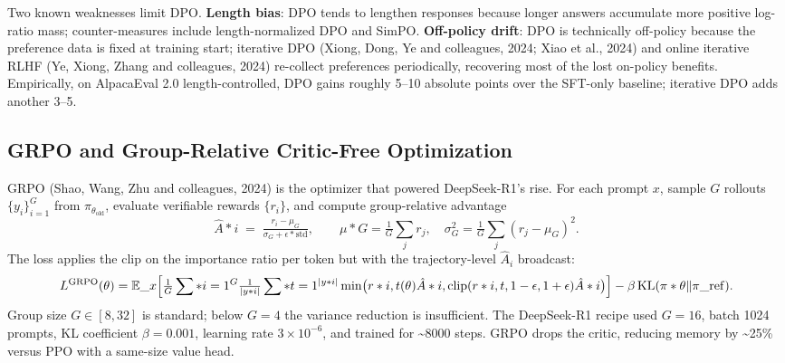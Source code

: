 Two known weaknesses limit DPO. \textbf{Length bias}: DPO tends to lengthen responses because longer answers accumulate more positive log-ratio mass; counter-measures include length-normalized DPO and SimPO. \textbf{Off-policy drift}: DPO is technically off-policy because the preference data is fixed at training start; iterative DPO (Xiong, Dong, Ye and colleagues, 2024; Xiao et al., 2024) and online iterative RLHF (Ye, Xiong, Zhang and colleagues, 2024) re-collect preferences periodically, recovering most of the lost on-policy benefits. Empirically, on AlpacaEval 2.0 length-controlled, DPO gains roughly 5--10 absolute points over the SFT-only baseline; iterative DPO adds another 3--5.

\subsection{GRPO and Group-Relative Critic-Free Optimization}\label{grpo-and-group-relative-critic-free-optimization}

GRPO (Shao, Wang, Zhu and colleagues, 2024) is the optimizer that powered DeepSeek-R1's rise. For each prompt \(x\), sample \(G\) rollouts \(\{y_i\}_{i=1}^{G}\) from \(\pi_{\theta_{\mathrm{old}}}\), evaluate verifiable rewards \(\{r_i\}\), and compute group-relative advantage
\[\hat A*i \;=\; \tfrac{r_i - \mu_G}{\sigma_G + \epsilon*{\mathrm{std}}}, \qquad \mu*G = \tfrac{1}{G}\sum_j r_j, \quad \sigma_G^2 = \tfrac{1}{G}\sum_j (r_j-\mu_G)^2.\]
The loss applies the clip on the importance ratio per token but with the trajectory-level \(\hat A_i\) broadcast:
\[L^{\mathrm{GRPO}}(\theta) = \mathbb{E}\_x\Bigl[ \tfrac{1}{G}\sum*{i=1}^{G} \tfrac{1}{|y*i|}\sum*{t=1}^{|y*i|} \min\bigl(r*{i,t}(\theta)\hat A*i, \mathrm{clip}(r*{i,t}, 1-\epsilon,1+\epsilon)\hat A*i\bigr) \Bigr] - \beta \,\mathrm{KL}(\pi*\theta \| \pi\_{\mathrm{ref}}).\]
Group size \(G \in [8, 32]\) is standard; below \(G=4\) the variance reduction is insufficient. The DeepSeek-R1 recipe used \(G = 16\), batch 1024 prompts, KL coefficient \(\beta = 0.001\), learning rate \(3 \times 10^{-6}\), and trained for \textasciitilde8000 steps. GRPO drops the critic, reducing memory by \textasciitilde25\% versus PPO with a same-size value head.

